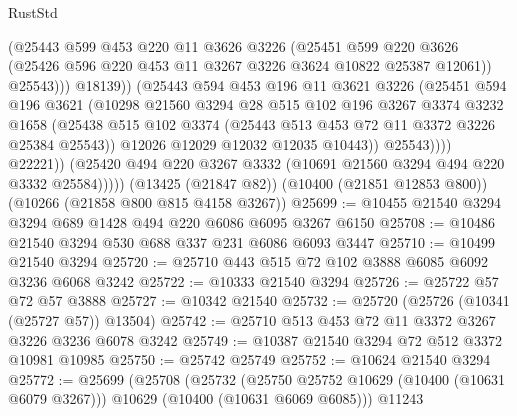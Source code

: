 \begin{lexlean}{RustStd}
\begin{coremodule}
                            (@25443
                              @599
                              @453
                              @220
                              @11
                              @3626
                              @3226
                              (@25451
                                @599
                                @220
                                @3626
                                (@25426 @596 @220 @453 @11 @3267 @3226 @3624 @10822 @25387 @12061))
                              @25543)))
                        @18139))
                    (@25443
                      @594
                      @453
                      @196
                      @11
                      @3621
                      @3226
                      (@25451
                        @594
                        @196
                        @3621
                        (@10298
                          @21560
                          @3294
                          @28
                          @515
                          @102
                          @196
                          @3267
                          @3374
                          @3232
                          @1658
                          (@25438
                            @515
                            @102
                            @3374
                            (@25443 @513 @453 @72 @11 @3372 @3226 @25384 @25543))
                          @12026
                          @12029
                          @12032
                          @12035
                          @10443))
                      @25543))))
              @22221))
          (@25420 @494 @220 @3267 @3332 (@10691 @21560 @3294 @494 @220 @3332 @25584)))))
    (@13425 (@21847 @82))
    (@10400 (@21851 @12853 @800))
    (@10266 (@21858 @800 @815 @4158 @3267))
@25699 := @10455 @21540 @3294 @3294 @689 @1428 @494 @220 @6086 @6095 @3267 @6150
@25708 := @10486 @21540 @3294 @530 @688 @337 @231 @6086 @6093 @3447
@25710 := @10499 @21540 @3294
@25720 := @25710 @443 @515 @72 @102 @3888 @6085 @6092 @3236 @6068 @3242
@25722 := @10333 @21540 @3294
@25726 := @25722 @57 @72 @57 @3888
@25727 := @10342 @21540
@25732 := @25720 (@25726 (@10341 (@25727 @57)) @13504)
@25742 := @25710 @513 @453 @72 @11 @3372 @3267 @3226 @3236 @6078 @3242
@25749 := @10387 @21540 @3294 @72 @512 @3372 @10981 @10985
@25750 := @25742 @25749
@25752 := @10624 @21540 @3294
@25772 := @25699
    (@25708
      (@25732
        (@25750 @25752 @10629 (@10400 (@10631 @6079 @3267)))
        @10629
        (@10400 (@10631 @6069 @6085)))
      @11243

\end{coremodule}
\end{lexlean}
